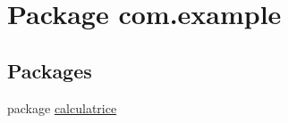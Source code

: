 \hypertarget{namespacecom_1_1example}{\section{Package com.\-example}
\label{namespacecom_1_1example}
}
\subsection*{Packages}
\begin{DoxyCompactItemize}
\item 
package \hyperlink{namespacecom_1_1example_1_1calculatrice}{calculatrice}
\end{DoxyCompactItemize}
